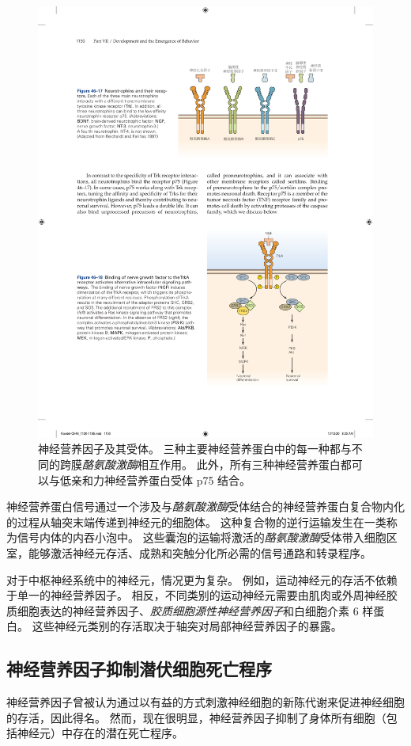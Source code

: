 \begin{figure}[htbp]
	\centering
	\includegraphics[width=0.7\linewidth]{chap46/fig_46_17}
	\caption{神经营养因子及其受体。
		三种主要神经营养蛋白中的每一种都与不同的跨膜\textit{酪氨酸激酶}相互作用。
		此外，所有三种神经营养蛋白都可以与低亲和力神经营养蛋白受体 p75 结合\cite{reichardt1997neurotrophic}。}
	\label{fig:46_17}
\end{figure}


神经营养蛋白信号通过一个涉及与\textit{酪氨酸激酶}受体结合的神经营养蛋白复合物内化的过程从轴突末端传递到神经元的细胞体。
这种复合物的逆行运输发生在一类称为信号内体的内吞小泡中。
这些囊泡的运输将激活的\textit{酪氨酸激酶}受体带入细胞区室，能够激活神经元存活、成熟和突触分化所必需的信号通路和转录程序。


对于中枢神经系统中的神经元，情况更为复杂。
例如，运动神经元的存活不依赖于单一的神经营养因子。
相反，不同类别的运动神经元需要由肌肉或外周神经胶质细胞表达的神经营养因子、\textit{胶质细胞源性神经营养因子}和白细胞介素 6 样蛋白。
这些神经元类别的存活取决于轴突对局部神经营养因子的暴露。



\subsection{神经营养因子抑制潜伏细胞死亡程序}

神经营养因子曾被认为通过以有益的方式刺激神经细胞的新陈代谢来促进神经细胞的存活，因此得名。
然而，现在很明显，神经营养因子抑制了身体所有细胞（包括神经元）中存在的潜在死亡程序。


